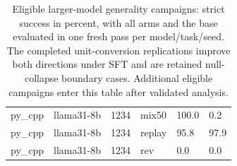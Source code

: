 \begin{table}[t]
\begin{tabular}{llllll}
py\_cpp & llama31-8b & 1234 & mix50 & 100.0 & 0.2 \\
py\_cpp & llama31-8b & 1234 & replay & 95.8 & 97.9 \\
py\_cpp & llama31-8b & 1234 & rev & 0.0 & 0.0 \\
\bottomrule
\end{tabular}
\caption{Eligible larger-model generality campaigns: strict success in percent, with all arms and the base evaluated in one fresh pass per model/task/seed. The completed unit-conversion replications improve both directions under SFT and are retained null-collapse boundary cases. Additional eligible campaigns enter this table after validated analysis.}
\label{tab:generality-snapshot}
\end{table}
